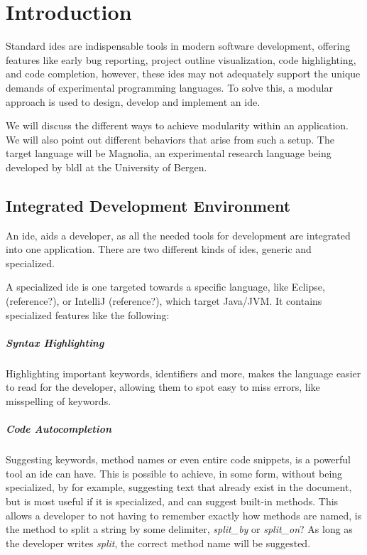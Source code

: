 \chapter{Introduction}

Standard \gls{ide}s are indispensable tools in modern software development,
offering features like early bug reporting, project outline visualization, code
highlighting, and code completion, however, these \gls{ide}s may not adequately
support the unique demands of experimental programming languages. To solve this,
a modular approach is used to design, develop and implement an \gls{ide}.

We will discuss the different ways to achieve modularity within an application.
We will also point out different behaviors that arise from such a setup. The
target language will be Magnolia, an experimental research language being
developed by \gls{bldl} at the University of Bergen.


\section{Integrated Development Environment}

An \gls{ide}, aids a developer, as all the needed tools for development are
integrated into one application. There are two different kinds of \gls{ide}s,
generic and specialized. 

A specialized \gls{ide} is one targeted towards a specific language, like
Eclipse, (reference?), or IntelliJ (reference?), which target Java/JVM. It
contains specialized features like the following:

\paragraph{Syntax Highlighting} Highlighting important keywords, identifiers
and more, makes the language easier to read for the developer, allowing them to
spot easy to miss errors, like misspelling of keywords.

\paragraph{Code Autocompletion} Suggesting keywords, method names or even entire
code snippets, is a powerful tool an \gls{ide} can have. This is possible to
achieve, in some form, without being specialized, by for example, suggesting
text that already exist in the document, but is most useful if it is
specialized, and can suggest built-in methods. This allows a developer to not
having to remember exactly how methods are named, is the method to split a
string by some delimiter, \textit{split\_by} or \textit{split\_on}? As long as
the developer writes \textit{split}, the correct method name will be suggested.

